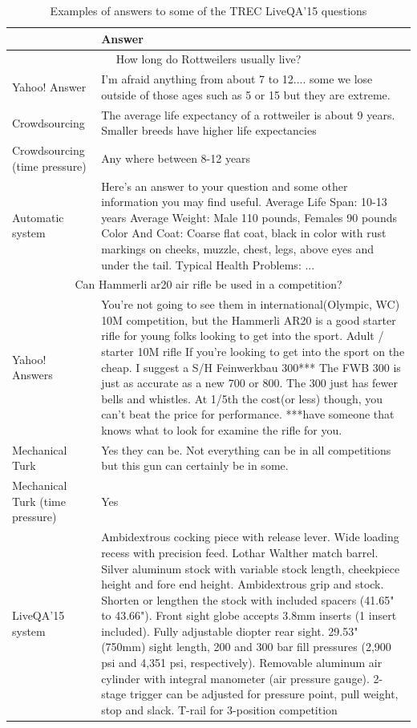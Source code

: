 \documentclass[11pt,letterpaper]{article}
\begin{document}
\begin{table}[h!t]
\centering
\caption{Examples of answers to some of the TREC LiveQA'15 questions}
\begin{tabular}{| p{3cm} | p{12.5cm} |}
\hline
 & Answer \\
\hline
\hline
\multicolumn{2}{|c|}{How long do Rottweilers usually live?} \\
\hline
Yahoo! Answer & I'm afraid anything from about 7 to 12.... some we lose outside of those ages such as 5 or 15 but they are extreme.\\
Crowdsourcing & The average life expectancy of a rottweiler is about 9 years. Smaller breeds have higher life expectancies\\
Crowdsourcing (time pressure) & Any where between 8-12 years\\
Automatic system & Here's an answer to your question and some other information you may find useful. Average Life Span: 10-13 years Average Weight: Male 110 pounds, Females 90 pounds Color And Coat: Coarse flat coat, black in color with rust markings on cheeks, muzzle, chest, legs, above eyes and under the tail. Typical Health Problems: ...\\
\hline
\hline
\multicolumn{2}{|c|}{Can Hammerli ar20 air rifle be used in a competition?}\\
\hline
Yahoo! Answers & You're not going to see them in international(Olympic, WC) 10M competition, but the Hammerli AR20 is a good starter rifle for young folks looking to get into the sport. Adult / starter 10M rifle If you're looking to get into the sport on the cheap. I suggest a S/H Feinwerkbau 300*** The FWB 300 is just as accurate as a new 700 or 800. The 300 just has fewer bells and whistles. At 1/5th the cost(or less) though, you can't beat the price for performance. ***have someone that knows what to look for examine the rifle for you.\\
Mechanical Turk & Yes they can be. Not everything can be in all competitions but this gun can certainly be in some.\\
Mechanical Turk (time pressure) & Yes\\
LiveQA'15 system & Ambidextrous cocking piece with release lever. Wide loading recess with precision feed. Lothar Walther match barrel. Silver aluminum stock with variable stock length, cheekpiece height and fore end height. Ambidextrous grip and stock. Shorten or lengthen the stock with included spacers (41.65" to 43.66"). Front sight globe accepts 3.8mm inserts (1 insert included). Fully adjustable diopter rear sight. 29.53" (750mm) sight length, 200 and 300 bar fill pressures (2,900 psi and 4,351 psi, respectively). Removable aluminum air cylinder with integral manometer (air pressure gauge). 2-stage trigger can be adjusted for pressure point, pull weight, stop and slack. T-rail for 3-position competition\\
\hline
\end{tabular}
\label{table:answer_examples}
\end{table}
\end{document}
